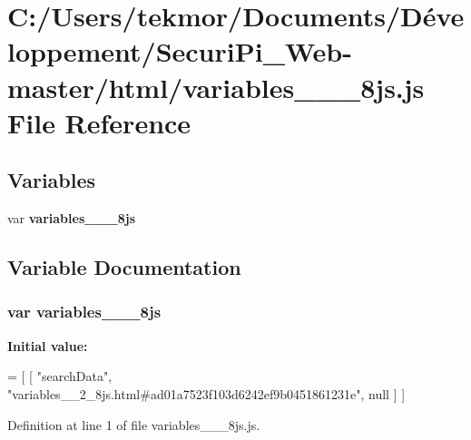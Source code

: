 \section{C\+:/\+Users/tekmor/\+Documents/\+Développement/\+Securi\+Pi\+\_\+\+Web-\/master/html/variables\+\_\+\+\_\+\_\+8js.js File Reference}
\label{variables____2__8js_8js}
\subsection*{Variables}
\begin{DoxyCompactItemize}
\item 
var {\bf variables\+\_\+\+\_\+\_\+8js}
\end{DoxyCompactItemize}


\subsection{Variable Documentation}
\subsubsection[{variables\+\_\+\+\_\+2\+\_\+8js}]{\setlength{\rightskip}{0pt plus 5cm}var variables\+\_\+\+\_\+\_\+8js}\label{variables____2__8js_8js_acc1bc6e425f054eeb848fed2c50a6dee}
{\bfseries Initial value\+:}
\begin{DoxyCode}
=
[
    [ \textcolor{stringliteral}{"searchData"}, \textcolor{stringliteral}{"variables\_\_2\_8js.html#ad01a7523f103d6242ef9b0451861231e"}, null ]
]
\end{DoxyCode}


Definition at line 1 of file variables\+\_\+\+\_\+\_\+8js.\+js.

